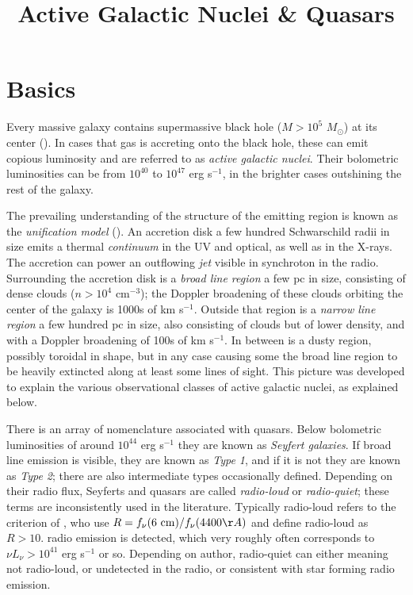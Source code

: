 \title{\bf Active Galactic Nuclei \& Quasars}

\section{Basics}

Every massive galaxy contains supermassive black hole ($M> 10^5$
$M_\odot$) at its center (\citealt{kormendy13a}). In cases that gas is
accreting onto the black hole, these can emit copious luminosity and
are referred to as {\it active galactic nuclei}. Their bolometric
luminosities can be from $10^{40}$ to $10^{47}$ erg s$^{-1}$, in the
brighter cases outshining the rest of the galaxy.

The prevailing understanding of the structure of the emitting region
is known as the {\it unification model} (\citealt{antonucci93a,
netzer15a}). An accretion disk a few hundred Schwarschild radii in
size emits a thermal {\it continuum} in the UV and optical, as well as
in the X-rays. The accretion can power an outflowing {\it jet} visible
in synchroton in the radio. Surrounding the accretion disk is a {\it
broad line region} a few pc in size, consisting of dense clouds
($n>10^4$ cm$^{-3}$); the Doppler broadening of these clouds orbiting
the center of the galaxy is 1000s of km s$^{-1}$. Outside that region
is a {\it narrow line region} a few hundred pc in size, also
consisting of clouds but of lower density, and with a Doppler
broadening of 100s of km s$^{-1}$. In between is a dusty region,
possibly toroidal in shape, but in any case causing some the broad
line region to be heavily extincted along at least some lines of
sight. This picture was developed to explain the various observational
classes of active galactic nuclei, as explained below.

There is an array of nomenclature associated with quasars. Below
bolometric luminosities of around $10^{44}$ erg s$^{-1}$ they are
known as {\it Seyfert galaxies}. If broad line emission is visible,
they are known as {\it Type 1}, and if it is not they are known as
{\it Type 2}; there are also intermediate types occasionally
defined. Depending on their radio flux, Seyferts and quasars are
called {\it radio-loud} or {\it radio-quiet}; these terms are
inconsistently used in the literature. Typically radio-loud refers to
the criterion of \citet{kellerman89a}, who use $R = f_{\nu}(6{\rm
~cm}) / f_\nu (4400 \AA)$ and define radio-loud as $R>10$.  radio
emission is detected, which very roughly often corresponds to $\nu
L_\nu > 10^{41}$ erg s$^{-1}$ or so. Depending on author, radio-quiet
can either meaning not radio-loud, or undetected in the radio, or
consistent with star forming radio emission.

